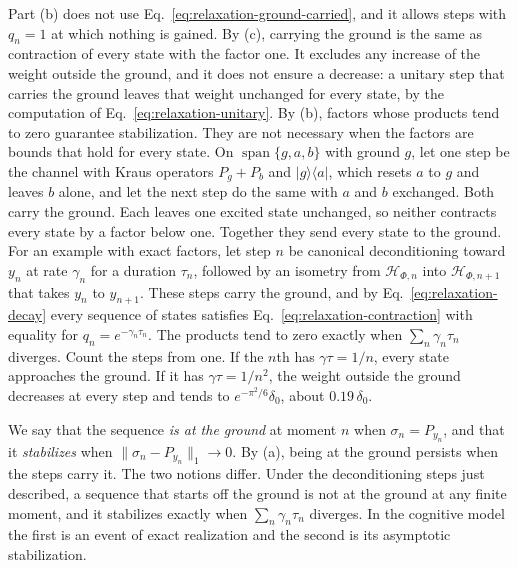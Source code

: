 \documentclass[11pt]{article}
\theoremstyle{definition}
\DeclareMathOperator{\Span}{span}
\newcommand{\ket}[1]{\lvert #1\rangle}
\newcommand{\bra}[1]{\langle #1\rvert}
\begin{document}
Part (b) does not use Eq.~\eqref{eq:relaxation-ground-carried}, and it allows steps with $q_n=1$ at which nothing is gained. By (c), carrying the ground is the same as contraction of every state with the factor one. It excludes any increase of the weight outside the ground, and it does not ensure a decrease: a unitary step that carries the ground leaves that weight unchanged for every state, by the computation of Eq.~\eqref{eq:relaxation-unitary}. By (b), factors whose products tend to zero guarantee stabilization. They are not necessary when the factors are bounds that hold for every state. On $\Span\{g,a,b\}$ with ground $g$, let one step be the channel with Kraus operators $P_g+P_b$ and $\ket{g}\!\bra{a}$, which resets $a$ to $g$ and leaves $b$ alone, and let the next step do the same with $a$ and $b$ exchanged. Both carry the ground. Each leaves one excited state unchanged, so neither contracts every state by a factor below one. Together they send every state to the ground. For an example with exact factors, let step $n$ be canonical deconditioning toward $y_n$ at rate $\gamma_n$ for a duration $\tau_n$, followed by an isometry from $\mathcal H_{\Phi,n}$ into $\mathcal H_{\Phi,n+1}$ that takes $y_n$ to $y_{n+1}$. These steps carry the ground, and by Eq.~\eqref{eq:relaxation-decay} every sequence of states satisfies Eq.~\eqref{eq:relaxation-contraction} with equality for $q_n=e^{-\gamma_n\tau_n}$. The products tend to zero exactly when $\sum_n\gamma_n\tau_n$ diverges. Count the steps from one. If the $n$th has $\gamma\tau=1/n$, every state approaches the ground. If it has $\gamma\tau=1/n^2$, the weight outside the ground decreases at every step and tends to $e^{-\pi^2/6}\delta_0$, about $0.19\,\delta_0$.

We say that the sequence \emph{is at the ground} at moment $n$ when $\sigma_n=P_{y_n}$, and that it \emph{stabilizes} when $\|\sigma_n-P_{y_n}\|_1\to0$. By (a), being at the ground persists when the steps carry it. The two notions differ. Under the deconditioning steps just described, a sequence that starts off the ground is not at the ground at any finite moment, and it stabilizes exactly when $\sum_n\gamma_n\tau_n$ diverges. In the cognitive model the first is an event of exact realization and the second is its asymptotic stabilization.
\end{document}
